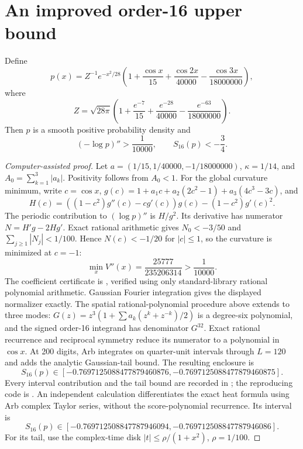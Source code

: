 \section{An improved order-16 upper bound}\label{sec:witness}
\begin{proposition}
Define
\[
 p(x)=Z^{-1}e^{-x^2/28}
 \left(1+\frac{\cos x}{15}+\frac{\cos2x}{40000}
            -\frac{\cos3x}{18000000}\right),
\]
where
\[
 Z=\sqrt{28\pi}
 \left(1+\frac{e^{-7}}{15}+\frac{e^{-28}}{40000}
             -\frac{e^{-63}}{18000000}\right).
\]
Then $p$ is a smooth positive probability density and
\[
 (-\log p)''>\frac1{10000},\qquad S_{16}(p)<-\frac34.
\]
\end{proposition}
\begin{proof}[Computer-assisted proof]
Let $a=(1/15,1/40000,-1/18000000)$, $\kappa=1/14$, and
$A_0=\sum_{k=1}^3|a_k|$. Positivity follows from $A_0<1$.
For the global curvature minimum, write $c=\cos x$,
$g(c)=1+a_1c+a_2(2c^2-1)+a_3(4c^3-3c)$, and
\[
 H(c)=((1-c^2)g''(c)-cg'(c))g(c)-(1-c^2)g'(c)^2.
\]
The periodic contribution to $(\log p)''$ is $H/g^2$. Its derivative
has numerator $N=H'g-2Hg'$. Exact rational arithmetic gives
$N_0<-3/50$ and $\sum_{j\ge1}|N_j|<1/100$.
Hence $N(c)<-1/20$ for $|c|\le1$, so the curvature is minimized at $c=-1$:
\[
 \min_x V''(x)=\frac{25777}{235206314}>\frac1{10000}.
\]
The coefficient certificate is ,
verified using only standard-library rational polynomial arithmetic.
Gaussian Fourier integration gives the displayed normalizer exactly.
The spatial rational-polynomial procedure above extends to three modes:
$G(z)=z^3(1+\sum a_k(z^k+z^{-k})/2)$ is a degree-six polynomial,
and the signed order-16 integrand has denominator $G^{32}$.
Exact rational recurrence and reciprocal symmetry reduce its numerator to
a polynomial in $\cos x$. At 200 digits, Arb integrates on quarter-unit
intervals through $L=120$ and adds the analytic Gaussian-tail bound.
The resulting enclosure is
\[
 S_{16}(p)\in[-0.7697125088477879460876,
              -0.7697125088477879460875].
\]
Every interval contribution and the tail bound are recorded in
; the reproducing code is
.
An independent calculation differentiates the exact heat formula using
Arb complex Taylor series, without the score-polynomial recurrence. Its
interval is
\[
 S_{16}(p)\in[-0.769712508847787946094,
              -0.769712508847787946086].
\]
For its tail, use the complex-time disk $|t|\le\rho/(1+x^2)$, $\rho=1/100$.

\end{proof}
